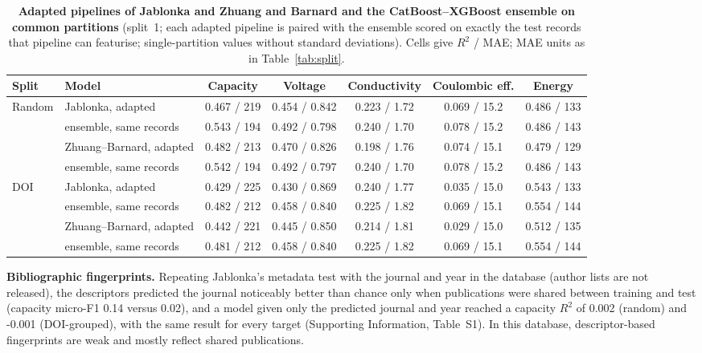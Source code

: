 \documentclass[journal=jcisd8,manuscript=article,layout=traditional]{achemso}
\begin{document}
\begin{table}[htbp]
    \centering\small
    \caption{\textbf{Adapted pipelines of Jablonka \cite{jablonka2026clever} and Zhuang and Barnard \cite{zhuang2024property} and the CatBoost--XGBoost ensemble on common partitions} (split~1; each adapted pipeline is paired with the ensemble scored on exactly the test records that pipeline can featurise; single-partition values without standard deviations). Cells give $R^2$ / MAE; MAE units as in Table~\ref{tab:split}.}
    \label{tab:adapted}
    \begin{adjustbox}{max width=\textwidth}
    \begin{tabular}{@{}llccccc@{}}
        \toprule
        Split & Model & Capacity & Voltage & Conductivity & Coulombic eff. & Energy \\
        \midrule
        Random & Jablonka, adapted & 0.467 / 219 & 0.454 / 0.842 & 0.223 / 1.72 & 0.069 / 15.2 & 0.486 / 133 \\
        & \quad ensemble, same records & 0.543 / 194 & 0.492 / 0.798 & 0.240 / 1.70 & 0.078 / 15.2 & 0.486 / 143 \\
        & Zhuang--Barnard, adapted & 0.482 / 213 & 0.470 / 0.826 & 0.198 / 1.76 & 0.074 / 15.1 & 0.479 / 129 \\
        & \quad ensemble, same records & 0.542 / 194 & 0.492 / 0.797 & 0.240 / 1.70 & 0.078 / 15.2 & 0.486 / 143 \\
        \midrule
        DOI    & Jablonka, adapted & 0.429 / 225 & 0.430 / 0.869 & 0.240 / 1.77 & 0.035 / 15.0 & 0.543 / 133 \\
        & \quad ensemble, same records & 0.482 / 212 & 0.458 / 0.840 & 0.225 / 1.82 & 0.069 / 15.1 & 0.554 / 144 \\
        & Zhuang--Barnard, adapted & 0.442 / 221 & 0.445 / 0.850 & 0.214 / 1.81 & 0.029 / 15.0 & 0.512 / 135 \\
        & \quad ensemble, same records & 0.481 / 212 & 0.458 / 0.840 & 0.225 / 1.82 & 0.069 / 15.1 & 0.554 / 144 \\
        \bottomrule
    \end{tabular}
    \end{adjustbox}
\end{table}

\textbf{Bibliographic fingerprints.} Repeating Jablonka's metadata test with the journal and year in the database (author lists are not released), the descriptors predicted the journal noticeably better than chance only when publications were shared between training and test (capacity micro-F1 0.14 versus 0.02), and a model given only the predicted journal and year reached a capacity $R^2$ of 0.002 (random) and -0.001 (DOI-grouped), with the same result for every target (Supporting Information, Table~S1). In this database, descriptor-based fingerprints are weak and mostly reflect shared publications.
\end{document}
